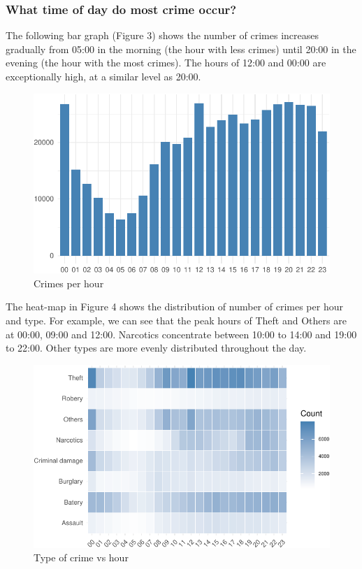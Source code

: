 \documentclass[]{article}
\begin{document}
\pagebreak

\subsubsection{What time of day do most crime
occur?}\label{what-time-of-day-do-most-crime-occur}

The following bar graph (Figure 3) shows the number of crimes increases
gradually from 05:00 in the morning (the hour with less crimes) until
20:00 in the evening (the hour with the most crimes). The hours of 12:00
and 00:00 are exceptionally high, at a similar level as 20:00.

\begin{figure}[H]

{\centering \includegraphics{201081646_MATH5741M_files/figure-latex/fig3-1} 

}

\caption{Crimes per hour}\label{fig:fig3}
\end{figure}

The heat-map in Figure 4 shows the distribution of number of crimes per
hour and type. For example, we can see that the peak hours of Theft and
Others are at 00:00, 09:00 and 12:00. Narcotics concentrate between
10:00 to 14:00 and 19:00 to 22:00. Other types are more evenly
distributed throughout the day.

\begin{figure}[H]

{\centering \includegraphics{201081646_MATH5741M_files/figure-latex/fig4-1} 

}

\caption{Type of crime vs hour}\label{fig:fig4}
\end{figure}
\end{document}
